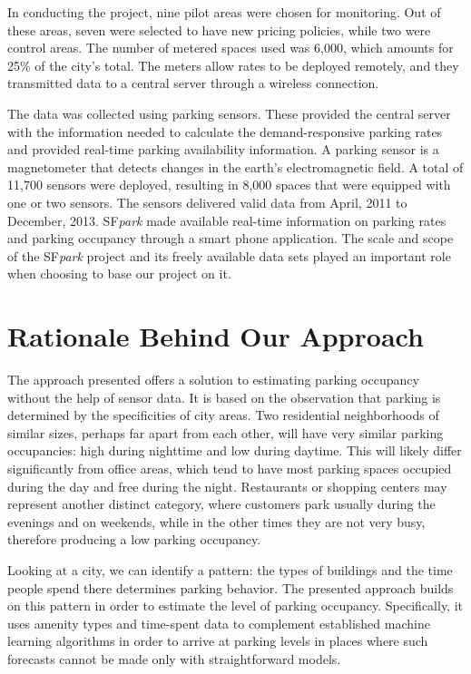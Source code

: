 	In conducting the project, nine pilot areas were chosen for monitoring. Out of these areas, seven were selected to have new pricing policies, while two were control areas. The number of metered spaces used was 6,000, which amounts for 25\% of the city's total. The meters allow rates to be deployed remotely, and they transmitted data to a central server through a wireless connection.
	
	The data was collected using parking sensors. These provided the central server with the information needed to calculate the demand-responsive parking rates and provided real-time parking availability information. A parking sensor is a magnetometer that detects changes in the earth's electromagnetic field. A total of 11,700 sensors were deployed, resulting in 8,000 spaces that were equipped with one or two sensors. The sensors delivered valid data from April, 2011 to December, 2013. SF\textit{park} made available real-time information on parking rates and parking occupancy through a smart phone application. The scale and scope of the SF\textit{park} project and its freely available data sets played an important role when choosing to base our project on it.
	
	\section{Rationale Behind Our Approach}
	The approach presented offers a solution to estimating parking occupancy without the help of sensor data. It is based on the observation that parking is determined by the specificities of city areas. Two residential neighborhoods of similar sizes, perhaps far apart from each other, will have very similar parking occupancies: high during nighttime and low during daytime. This will likely differ significantly from office areas, which tend to have most parking spaces occupied during the day and free during the night. Restaurants or shopping centers may represent another distinct category, where customers park usually during the evenings and on weekends, while in the other times they are not very busy, therefore producing a low parking occupancy.
	
	Looking at a city, we can identify a pattern: the types of buildings and the time people spend there determines parking behavior. The presented approach builds on this pattern in order to estimate the level of parking occupancy. Specifically, it uses amenity types and time-spent data to complement established machine learning algorithms in order to arrive at parking levels in places where such forecasts cannot be made only with straightforward models.
	
